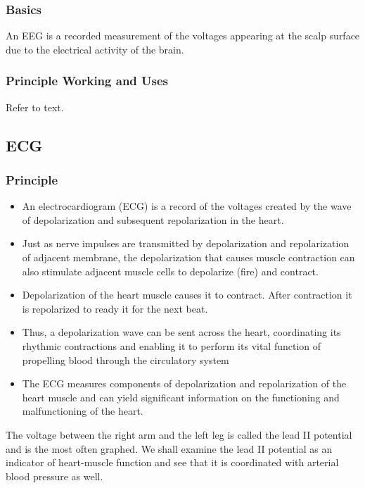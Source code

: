 \documentclass[12pt]{book}
\begin{document}
\subsubsection{Basics}

An EEG is a recorded measurement of the voltages appearing at the scalp surface due to the electrical activity of the brain.
\subsubsection{Principle Working and Uses}
Refer to text.

\subsection{ECG}

\subsubsection{Principle}
\begin{itemize}
	\item An electrocardiogram (ECG) is a record of the voltages created by the wave of depolarization and subsequent repolarization in the heart.

	\item Just as nerve impulses are transmitted by depolarization and repolarization of adjacent membrane, the depolarization that causes muscle contraction can also stimulate adjacent muscle cells
	to depolarize (fire) and contract.

	\item Depolarization of the heart muscle causes it to contract. After contraction it is repolarized to ready it for the next beat.

	\item Thus, a depolarization wave can be sent across the heart, coordinating its rhythmic contractions and enabling it to perform its vital function of propelling blood through the circulatory system

	\item The ECG measures components of depolarization and repolarization of the heart muscle and can yield significant information on the functioning and malfunctioning of the heart.

\end{itemize}
The voltage between the right arm and the left leg is called the lead II potential and is the most often graphed. We shall examine the lead II potential as an indicator of heart-muscle function and see that it is coordinated with arterial blood pressure as well.
\end{document}
